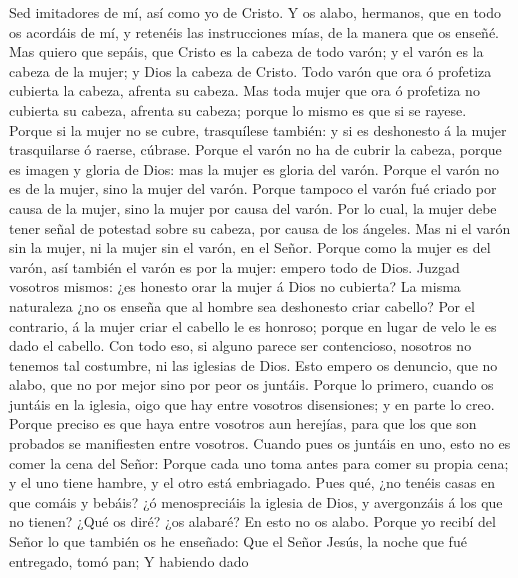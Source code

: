  Sed imitadores de mí, así como yo de Cristo.
 Y os alabo, hermanos, que en todo os acordáis de mí, y
retenéis las instrucciones mías, de la manera que os enseñé.
 Mas quiero que sepáis, que Cristo es la cabeza de todo
varón; y el varón es la cabeza de la mujer; y Dios la cabeza de Cristo.
 Todo varón que ora ó profetiza cubierta la cabeza,
afrenta su cabeza.  Mas toda mujer que ora ó profetiza no
cubierta su cabeza, afrenta su cabeza; porque lo mismo es que si se
rayese.  Porque si la mujer no se cubre, trasquílese
también: y si es deshonesto á la mujer trasquilarse ó raerse, cúbrase.
 Porque el varón no ha de cubrir la cabeza, porque es
imagen y gloria de Dios: mas la mujer es gloria del varón.
 Porque el varón no es de la mujer, sino la mujer del
varón.  Porque tampoco el varón fué criado por causa de la
mujer, sino la mujer por causa del varón.  Por lo cual,
la mujer debe tener señal de potestad sobre su cabeza, por causa de los
ángeles.  Mas ni el varón sin la mujer, ni la mujer sin
el varón, en el Señor.  Porque como la mujer es del
varón, así también el varón es por la mujer: empero todo de Dios.
 Juzgad vosotros mismos: ¿es honesto orar la mujer á Dios
no cubierta?  La misma naturaleza ¿no os enseña que al
hombre sea deshonesto criar cabello?  Por el contrario, á
la mujer criar el cabello le es honroso; porque en lugar de velo le es
dado el cabello.  Con todo eso, si alguno parece ser
contencioso, nosotros no tenemos tal costumbre, ni las iglesias de Dios.
 Esto empero os denuncio, que no alabo, que no por mejor
sino por peor os juntáis.  Porque lo primero, cuando os
juntáis en la iglesia, oigo que hay entre vosotros disensiones; y en
parte lo creo.  Porque preciso es que haya entre vosotros
aun herejías, para que los que son probados se manifiesten entre
vosotros.  Cuando pues os juntáis en uno, esto no es
comer la cena del Señor:  Porque cada uno toma antes para
comer su propia cena; y el uno tiene hambre, y el otro está embriagado.
 Pues qué, ¿no tenéis casas en que comáis y bebáis? ¿ó
menospreciáis la iglesia de Dios, y avergonzáis á los que no tienen?
¿Qué os diré? ¿os alabaré? En esto no os alabo.  Porque
yo recibí del Señor lo que también os he enseñado: Que el Señor Jesús,
la noche que fué entregado, tomó pan;  Y habiendo dado
